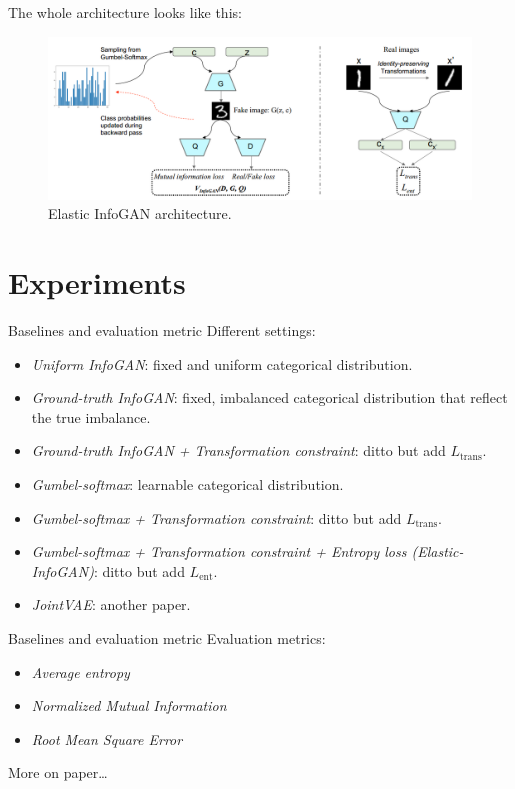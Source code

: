 \documentclass[xcolor={svgnames}]{beamer}
\begin{document}
\begin{frame}
  The whole architecture looks like this:
  \begin{figure}[hbp]
    \centering
    \includegraphics[width=\textwidth]{figures/arch.png}
    \caption{Elastic InfoGAN architecture.}
    \label{fig:arch}
  \end{figure}
\end{frame}


\section{Experiments}
\begin{frame}{Baselines and evaluation metric}
  Different settings:
  \begin{itemize}
    \item \emph{Uniform InfoGAN}: fixed and uniform categorical distribution.
    \item \emph{Ground-truth InfoGAN}: fixed, imbalanced categorical 
      distribution that reflect the true imbalance.
    \item \emph{Ground-truth InfoGAN + Transformation constraint}: ditto but
      add $L_{\text{trans}}$.
    \item \emph{Gumbel-softmax}: learnable categorical distribution.
    \item \emph{Gumbel-softmax + Transformation constraint}: ditto but add 
      $L_{\text{trans}}$.
    \item \emph{Gumbel-softmax + Transformation constraint + Entropy loss 
      (Elastic-InfoGAN)}: ditto but add $L_{\text{ent}}$.
    \item \emph{JointVAE}: another paper.
  \end{itemize}
\end{frame}


\begin{frame}{Baselines and evaluation metric}
  Evaluation metrics:
  \begin{itemize}
    \item \emph{Average entropy}
    \item \emph{Normalized Mutual Information}
    \item \emph{Root Mean Square Error}
  \end{itemize}

  More on paper\ldots
\end{frame}
\end{document}
